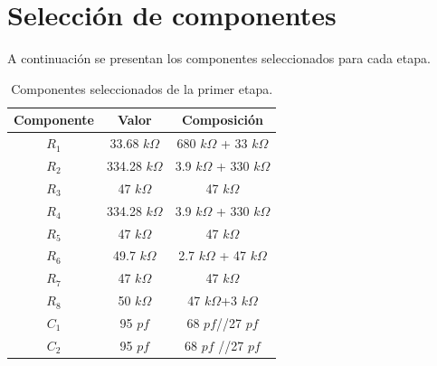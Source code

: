 \section{Selección de componentes}
A continuación se presentan los componentes seleccionados para cada etapa.
\begin{multicols}{2}
\begin{table}[H]
\centering
\begin{tabular}{ccc}
\hline
\multicolumn{1}{c}{Componente} & \multicolumn{1}{c}{Valor} & Composición \\ \hline
$R_1$                           & 33.68 $k\Omega$                     & 680 $k\Omega$ + 33 $k\Omega$     \\
$R_2$                           & 334.28 $k\Omega$                    & 3.9 $k\Omega$ + 330 $k\Omega$   \\
$R_3$                           & 47 $k\Omega$                        & 47 $k\Omega$         \\
$R_4$                           & 334.28 $k\Omega$                    & 3.9 $k\Omega$ + 330 $k\Omega$   \\
$R_5$                           & 47 $k\Omega$                        & 47 $k\Omega$         \\
$R_6$                           & 49.7 $k\Omega$                        & 2.7 $k\Omega$ + 47 $k\Omega$         \\
$R_7$                           & 47 $k\Omega$                        & 47 $k\Omega$         \\
$R_8$                           & 50 $k\Omega$                        & 47 $k\Omega$+3 $k\Omega$         \\
$C_1$                           & 95 $pf$                        & 68 $pf$//27 $pf$     \\
$C_2$                           & 95 $pf$                        & 68 $pf$ //27 $pf$    \\
\hline
\end{tabular}
\caption{Componentes seleccionados de la primer etapa.}
\end{table}


\end{multicols}
